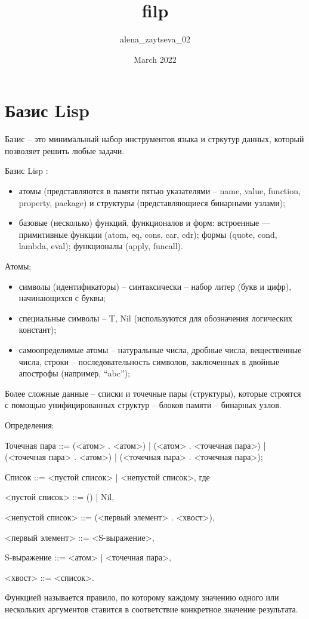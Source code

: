 \documentclass{article}
\title{filp}
\author{alena\_zaytseva\_02 }
\date{March 2022}
\begin{document}
\section*{Базис Lisp}
	
Базис -- это минимальный набор инструментов языка и стркутур данных, который позволяет решить любые задачи.


Базис Lisp :

\begin{itemize}
	\item атомы (представляются в памяти пятью указателями  --  name, value, function, property, package) и структуры (представляющиеся бинарными узлами);
	\item базовые (несколько) функций, функционалов и форм: встроенные — примитивные функции (atom, eq, cons, car, cdr); формы (quote, cond, lambda, eval); функционалы (apply, funcall).
\end{itemize}

Атомы:
\begin{itemize} 
	\item символы (идентификаторы) – синтаксически – набор литер (букв и цифр), начинающихся с буквы;
	\item специальные символы – {T, Nil} (используются для обозначения логических констант);
	\item самоопределимые атомы – натуральные числа, дробные числа, вещественные числа, строки – последовательность символов, заключенных в двойные апострофы (например, “abc”);
\end{itemize} 

Более сложные данные – списки и точечные пары (структуры), которые строятся с помощью унифицированных структур – блоков памяти – бинарных узлов.

Определения:

Точечная пара ::= (<атом> . <атом>) | (<атом> . <точечная пара>) | (<точечная пара> . <атом>) | (<точечная пара> . <точечная пара>);

Список ::= <пустой список> | <непустой список>, где 

<пустой список> ::= () | Nil,

<непустой список> ::= (<первый элемент> . <хвост>),

<первый элемент> ::= <S-выражение>,

S-выражение ::= <атом> | <точечная пара>,

<хвост> ::= <список>.


Функцией называется правило, по которому каждому значению одного или нескольких  аргументов ставится в соответствие конкретное значение результата. 
\end{document}

